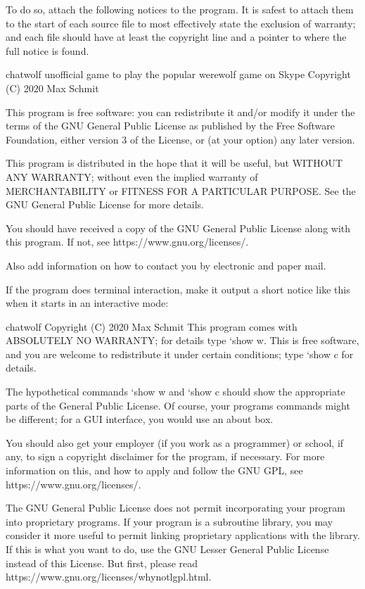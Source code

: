 \documentclass[letterpaper,10pt,english]{sphinxmanual}
\begin{document}
\begin{sphinxVerbatim}[commandchars=\\\{\}]
  To do so, attach the following notices to the program.  It is safest
to attach them to the start of each source file to most effectively
state the exclusion of warranty; and each file should have at least
the \PYGZdq{}copyright\PYGZdq{} line and a pointer to where the full notice is found.

    \PYGZdq{}chatwolf\PYGZdq{} unofficial game to play the popular werewolf game on Skype
    Copyright (C) 2020 Max Schmit

    This program is free software: you can redistribute it and/or modify
    it under the terms of the GNU General Public License as published by
    the Free Software Foundation, either version 3 of the License, or
    (at your option) any later version.

    This program is distributed in the hope that it will be useful,
    but WITHOUT ANY WARRANTY; without even the implied warranty of
    MERCHANTABILITY or FITNESS FOR A PARTICULAR PURPOSE.  See the
    GNU General Public License for more details.

    You should have received a copy of the GNU General Public License
    along with this program.  If not, see \PYGZlt{}https://www.gnu.org/licenses/\PYGZgt{}.

Also add information on how to contact you by electronic and paper mail.

  If the program does terminal interaction, make it output a short
notice like this when it starts in an interactive mode:

    chatwolf  Copyright (C) 2020  Max Schmit
    This program comes with ABSOLUTELY NO WARRANTY; for details type `show w\PYGZsq{}.
    This is free software, and you are welcome to redistribute it
    under certain conditions; type `show c\PYGZsq{} for details.

The hypothetical commands `show w\PYGZsq{} and `show c\PYGZsq{} should show the appropriate
parts of the General Public License.  Of course, your program\PYGZsq{}s commands
might be different; for a GUI interface, you would use an \PYGZdq{}about box\PYGZdq{}.

  You should also get your employer (if you work as a programmer) or school,
if any, to sign a \PYGZdq{}copyright disclaimer\PYGZdq{} for the program, if necessary.
For more information on this, and how to apply and follow the GNU GPL, see
\PYGZlt{}https://www.gnu.org/licenses/\PYGZgt{}.

  The GNU General Public License does not permit incorporating your program
into proprietary programs.  If your program is a subroutine library, you
may consider it more useful to permit linking proprietary applications with
the library.  If this is what you want to do, use the GNU Lesser General
Public License instead of this License.  But first, please read
\PYGZlt{}https://www.gnu.org/licenses/why\PYGZhy{}not\PYGZhy{}lgpl.html\PYGZgt{}.
\end{sphinxVerbatim}
\end{document}
